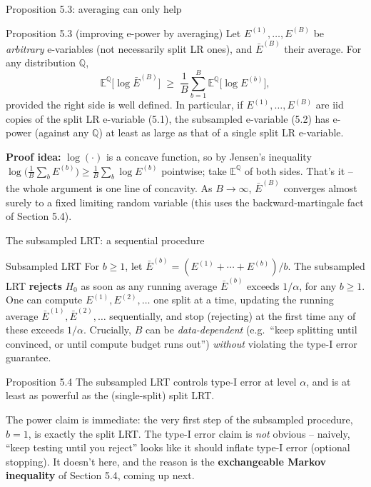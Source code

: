 \documentclass[aspectratio=169,10pt]{beamer}
\newcommand{\E}{\mathbb{E}}
\begin{document}
\begin{frame}{Proposition 5.3: averaging can only help}

  \begin{alertblock}{Proposition 5.3 (improving e-power by averaging)}
    Let $E^{(1)},\ldots,E^{(B)}$ be \emph{arbitrary} e-variables (not
    necessarily split LR ones), and $\bar E^{(B)}$ their average. For
    any distribution $\mathbb{Q}$,
    $$ \E^{\mathbb{Q}}\big[\log \bar E^{(B)}\big] \;\ge\; \frac{1}{B}\sum_{b=1}^{B} \E^{\mathbb{Q}}\big[\log E^{(b)}\big], $$
    provided the right side is well defined. In particular, if
    $E^{(1)},\ldots,E^{(B)}$ are iid copies of the split LR e-variable
    (5.1), the subsampled e-variable (5.2) has e-power (against any
    $\mathbb{Q}$) at least as large as that of a single split LR
    e-variable.
  \end{alertblock}

  \textbf{Proof idea:} $\log(\cdot)$ is a concave function, so by
  Jensen's inequality $\log\!\big(\tfrac1B\sum_b E^{(b)}\big) \ge
  \tfrac1B\sum_b \log E^{(b)}$ pointwise; take $\E^{\mathbb Q}$ of both
  sides. That's it -- the whole argument is one line of concavity.
  As $B \to \infty$, $\bar E^{(B)}$ converges almost surely to a fixed
  limiting random variable (this uses the backward-martingale fact of
  Section 5.4).

\end{frame}

\begin{frame}{The subsampled LRT: a sequential procedure}

  \begin{block}{Subsampled LRT}
    For $b \ge 1$, let $\bar E^{(b)} = (E^{(1)}+\cdots+E^{(b)})/b$. The
    subsampled LRT \textbf{rejects} $H_0$ as soon as any running
    average $\bar E^{(b)}$ exceeds $1/\alpha$, for any $b \ge 1$. One
    can compute $E^{(1)}, E^{(2)}, \ldots$ one split at a time, updating
    the running average $\bar E^{(1)}, \bar E^{(2)}, \ldots$
    sequentially, and stop (rejecting) at the first time any of these
    exceeds $1/\alpha$. Crucially, $B$ can be \emph{data-dependent}
    (e.g.\ ``keep splitting until convinced, or until compute budget
    runs out'') \emph{without} violating the type-I error guarantee.
  \end{block}

  \begin{alertblock}{Proposition 5.4}
    The subsampled LRT controls type-I error at level $\alpha$, and is
    at least as powerful as the (single-split) split LRT.
  \end{alertblock}

  The power claim is immediate: the very first step of the subsampled
  procedure, $b=1$, is exactly the split LRT. The type-I error claim is
  \emph{not} obvious -- naively, ``keep testing until you reject'' looks
  like it should inflate type-I error (optional stopping). It doesn't
  here, and the reason is the \textbf{exchangeable Markov inequality} of
  Section 5.4, coming up next.

\end{frame}
\end{document}
